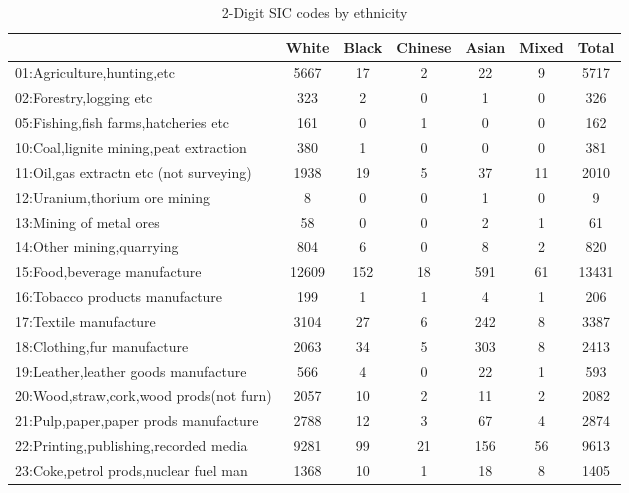 {
\def\sym#1{\ifmmode^{#1}\else\(^{#1}\)\fi}
\begin{longtable}{l*{6}{c}}
\caption{2-Digit SIC codes by ethnicity}\\
\hline\hline\endfirsthead\hline\endhead\hline\endfoot\endlastfoot
          &    White&    Black&  Chinese&    Asian&    Mixed&    Total\\
\hline
01:Agriculture,hunting,etc&     5667&       17&        2&       22&        9&     5717\\
02:Forestry,logging etc&      323&        2&        0&        1&        0&      326\\
05:Fishing,fish farms,hatcheries etc&      161&        0&        1&        0&        0&      162\\
10:Coal,lignite mining,peat extraction&      380&        1&        0&        0&        0&      381\\
11:Oil,gas extractn etc (not surveying)&     1938&       19&        5&       37&       11&     2010\\
12:Uranium,thorium ore mining&        8&        0&        0&        1&        0&        9\\
13:Mining of metal ores&       58&        0&        0&        2&        1&       61\\
14:Other mining,quarrying&      804&        6&        0&        8&        2&      820\\
15:Food,beverage manufacture&    12609&      152&       18&      591&       61&    13431\\
16:Tobacco products manufacture&      199&        1&        1&        4&        1&      206\\
17:Textile manufacture&     3104&       27&        6&      242&        8&     3387\\
18:Clothing,fur manufacture&     2063&       34&        5&      303&        8&     2413\\
19:Leather,leather goods manufacture&      566&        4&        0&       22&        1&      593\\
20:Wood,straw,cork,wood prods(not furn)&     2057&       10&        2&       11&        2&     2082\\
21:Pulp,paper,paper prods manufacture&     2788&       12&        3&       67&        4&     2874\\
22:Printing,publishing,recorded media&     9281&       99&       21&      156&       56&     9613\\
23:Coke,petrol prods,nuclear fuel man&     1368&       10&        1&       18&        8&     1405\\

\end{longtable}}
